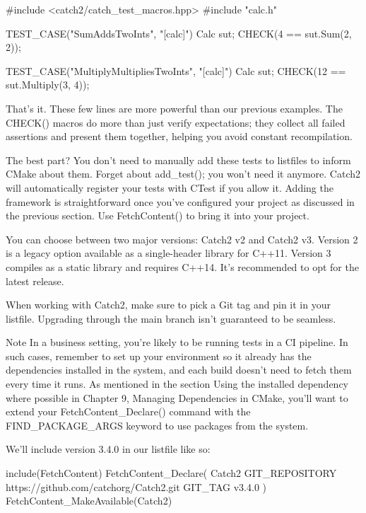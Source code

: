 
\begin{cpp}
#include <catch2/catch_test_macros.hpp>
#include "calc.h"

TEST_CASE("SumAddsTwoInts", "[calc]") {
    Calc sut;
    CHECK(4 == sut.Sum(2, 2));
}

TEST_CASE("MultiplyMultipliesTwoInts", "[calc]") {
    Calc sut;
    CHECK(12 == sut.Multiply(3, 4));
}
\end{cpp}

That’s it. These few lines are more powerful than our previous examples. The CHECK() macros do more than just verify expectations; they collect all failed assertions and present them together, helping you avoid constant recompilation.

The best part? You don’t need to manually add these tests to listfiles to inform CMake about them. Forget about add\_test(); you won’t need it anymore. Catch2 will automatically register your tests with CTest if you allow it. Adding the framework is straightforward once you’ve configured your project as discussed in the previous section. Use FetchContent() to bring it into your project.

You can choose between two major versions: Catch2 v2 and Catch2 v3. Version 2 is a legacy option available as a single-header library for C++11. Version 3 compiles as a static library and requires C++14. It’s recommended to opt for the latest release.

When working with Catch2, make sure to pick a Git tag and pin it in your listfile. Upgrading through the main branch isn’t guaranteed to be seamless.

\begin{myNotic}{Note}
In a business setting, you’re likely to be running tests in a CI pipeline. In such cases, remember to set up your environment so it already has the dependencies installed in the system, and each build doesn’t need to fetch them every time it runs. As mentioned in the section Using the installed dependency where possible in Chapter 9, Managing Dependencies in CMake, you’ll want to extend your FetchContent\_Declare() command with the FIND\_PACKAGE\_ARGS keyword to use packages from the system.
\end{myNotic}

We’ll include version 3.4.0 in our listfile like so:


\begin{cmake}
include(FetchContent)
FetchContent_Declare(
    Catch2
    GIT_REPOSITORY https://github.com/catchorg/Catch2.git
    GIT_TAG v3.4.0
)
FetchContent_MakeAvailable(Catch2)
\end{cmake}

